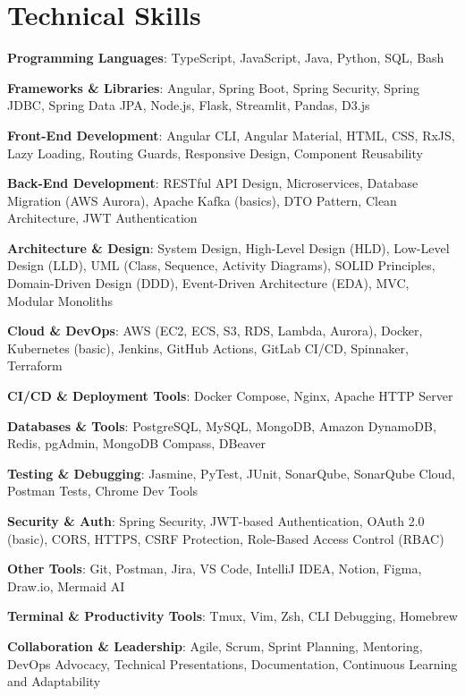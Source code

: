 \documentclass[10pt, letterpaper]{article}
\newenvironment{onecolentry}{\begin{adjustwidth}{0 cm}{0 cm}}{\end{adjustwidth}}
\begin{document}
\section{Technical Skills}
\begin{onecolentry}
    \item \textbf{Programming Languages}: TypeScript, JavaScript, Java, Python, SQL, Bash
    \item \textbf{Frameworks \& Libraries}: Angular, Spring Boot, Spring Security, Spring JDBC, Spring Data JPA, Node.js, Flask, Streamlit, Pandas, D3.js
    \item \textbf{Front-End Development}: Angular CLI, Angular Material, HTML, CSS, RxJS, Lazy Loading, Routing Guards, Responsive Design, Component Reusability
    \item \textbf{Back-End Development}: RESTful API Design, Microservices, Database Migration (AWS Aurora), Apache Kafka (basics), DTO Pattern, Clean Architecture, JWT Authentication
    \item \textbf{Architecture \& Design}: System Design, High-Level Design (HLD), Low-Level Design (LLD), UML (Class, Sequence, Activity Diagrams), SOLID Principles, Domain-Driven Design (DDD), Event-Driven Architecture (EDA), MVC, Modular Monoliths
    \item \textbf{Cloud \& DevOps}: AWS (EC2, ECS, S3, RDS, Lambda, Aurora), Docker, Kubernetes (basic), Jenkins, GitHub Actions, GitLab CI/CD, Spinnaker, Terraform
    \item \textbf{CI/CD \& Deployment Tools}: Docker Compose, Nginx, Apache HTTP Server
    \item \textbf{Databases \& Tools}: PostgreSQL, MySQL, MongoDB, Amazon DynamoDB, Redis, pgAdmin, MongoDB Compass, DBeaver
    \item \textbf{Testing \& Debugging}: Jasmine, PyTest, JUnit, SonarQube, SonarQube Cloud, Postman Tests, Chrome Dev Tools
    \item \textbf{Security \& Auth}: Spring Security, JWT-based Authentication, OAuth 2.0 (basic), CORS, HTTPS, CSRF Protection, Role-Based Access Control (RBAC)
    \item \textbf{Other Tools}: Git, Postman, Jira, VS Code, IntelliJ IDEA, Notion, Figma, Draw.io, Mermaid AI
    \item \textbf{Terminal \& Productivity Tools}: Tmux, Vim, Zsh, CLI Debugging, Homebrew
     \item \textbf{Collaboration \& Leadership}: Agile, Scrum, Sprint Planning, Mentoring, DevOps Advocacy, Technical Presentations, Documentation, Continuous Learning and Adaptability
\end{onecolentry}
\end{document}
